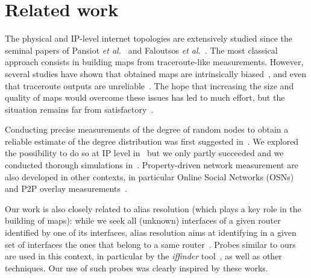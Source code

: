 \documentclass[conference]{IEEEtran}
\newcommand{\noteperso}[1]{\begin{center}
\fbox{\begin{minipage}{0.9\columnwidth}#1\end{minipage}}\end{center}}
\begin{document}

\section{Related work}
\label{sec:related}

The physical and IP-level internet topologies are extensively studied since the seminal papers of Pansiot {\em et al.}~\cite{280555} and Faloutsos {\em et al.}~\cite{DBLP:conf/sigcomm/FaloutsosFF99}. The most classical approach consists in building maps from traceroute-like measurements. However, several studies have shown that obtained maps are intrinsically biased~\cite{DBLP:conf/infocom/LakhinaBCX03,DBLP:journals/jacm/AchlioptasCKM09,willinger,MDBP10,DBLP:journals/tcs/DallAstaABVV06,DBLP:journals/cn/GuillaumeLM06,DBLP:conf/infocom/LatapyM08,roughan201110}, and even that traceroute outputs are unreliable~\cite{paristraceroute,pansiot2012,roughan201110}. The hope that increasing the size and quality of maps would overcome these issues has led to much effort, but the situation remains far from satisfactory~\cite{willinger,DBLP:conf/imw/BarfordBBC01,DBLP:conf/infocom/LatapyM08}.

Conducting precise measurements of the degree of random nodes to obtain a reliable estimate of the degree distribution was first suggested in~\cite{DBLP:conf/infocom/LakhinaBCX03}. We explored the possibility to do so at IP level in~\cite{CLR10} but we only partly succeeded and we conducted thorough simulations in~\cite{CT01}. Property-driven network measurement are also developed in other contexts, in particular Online Social Networks (OSNs)~\cite{kurant2011towards,gjoka2010walking} and P2P overlay measurements~\cite{stutzbach2009unbiased}.

Our work is also closely related to alias resolution (which plays a key role in the building of maps): while we seek all (unknown) interfaces of a given router identified by one of its interfaces, alias resolution aims at identifying in a given set of interfaces the ones that belong to a same router~\cite{DBLP:conf/infocom/GovindanT00,DBLP:journals/ton/GunesS09,alias-bias,keys2010internet}. Probes similar to ours are used in this context, in particular by the \emph{iffinder} tool~\cite{iffinder}, as well as other techniques. Our use of such probes was clearly inspired by these works.
\end{document}
